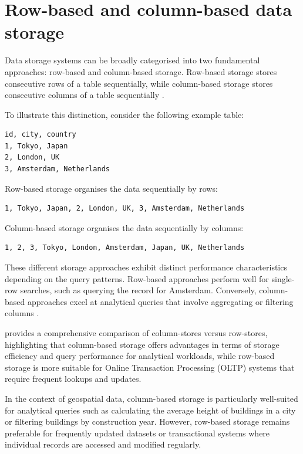 \section{Row-based and column-based data storage}
\label{tb:row_based_column_based_data_storage}

Data storage systems can be broadly categorised into two fundamental approaches: row-based and column-based storage. Row-based storage stores consecutive rows of a table sequentially, while column-based storage stores consecutive columns of a table sequentially \citep{clickhouse_column}.

To illustrate this distinction, consider the following example table:

\begin{verbatim}
id, city, country
1, Tokyo, Japan
2, London, UK
3, Amsterdam, Netherlands
\end{verbatim}

Row-based storage organises the data sequentially by rows:

\begin{verbatim}
1, Tokyo, Japan, 2, London, UK, 3, Amsterdam, Netherlands
\end{verbatim}

Column-based storage organises the data sequentially by columns:

\begin{verbatim}
1, 2, 3, Tokyo, London, Amsterdam, Japan, UK, Netherlands
\end{verbatim}

These different storage approaches exhibit distinct performance characteristics depending on the query patterns. Row-based approaches perform well for single-row searches, such as querying the record for Amsterdam. Conversely, column-based approaches excel at analytical queries that involve aggregating or filtering columns \citep{clickhouse_column}.

\citet{abadi_2008} provides a comprehensive comparison of column-stores versus row-stores, highlighting that column-based storage offers advantages in terms of storage efficiency and query performance for analytical workloads, while row-based storage is more suitable for Online Transaction Processing (OLTP) systems that require frequent lookups and updates.

In the context of geospatial data, column-based storage is particularly well-suited for analytical queries such as calculating the average height of buildings in a city or filtering buildings by construction year. However, row-based storage remains preferable for frequently updated datasets or transactional systems where individual records are accessed and modified regularly.
